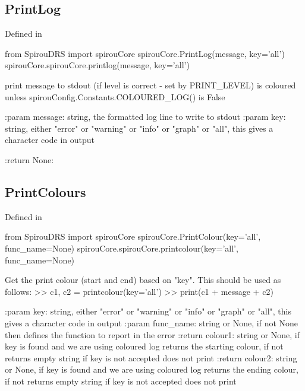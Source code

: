 \noindent\begin{minipage}{\textwidth}
\subsection{PrintLog}

Defined in \spirouCore{}

\begin{pythonbox}
from SpirouDRS import spirouCore
spirouCore.PrintLog(message, key='all')
spirouCore.spirouCore.printlog(message, key='all')
\end{pythonbox}

\begin{pythondocstring}
print message to stdout (if level is correct - set by PRINT_LEVEL)
is coloured unless spirouConfig.Constants.COLOURED_LOG() is False

:param message: string, the formatted log line to write to stdout
:param key: string, either "error" or "warning" or "info" or "graph" or
            "all", this gives a character code in output

:return None:
\end{pythondocstring}
\end{minipage}


\noindent\begin{minipage}{\textwidth}
\subsection{PrintColours}

Defined in \spirouCore{}

\begin{pythonbox}
from SpirouDRS import spirouCore
spirouCore.PrintColour(key='all', func_name=None)
spirouCore.spirouCore.printcolour(key='all', func_name=None)
\end{pythonbox}

\begin{pythondocstring}
Get the print colour (start and end) based on "key".
This should be used as follows:
    >> c1, c2 = printcolour(key='all')
    >> print(c1 + message + c2)

:param key: string, either "error" or "warning" or "info" or "graph" or
            "all", this gives a character code in output
:param func_name: string or None, if not None then defines the function to
                  report in the error
:return colour1: string or None, if key is found and we are using coloured
                 log returns the starting colour, if not returns empty
                 string if key is not accepted does not print
:return colour2: string or None, if key is found and we are using coloured
                 log returns the ending colour, if not returns empty
                 string if key is not accepted does not print
\end{pythondocstring}
\end{minipage}



